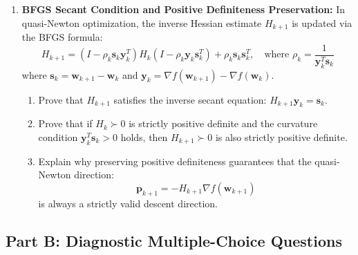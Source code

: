 \begin{enumerate}[label=\textbf{P\arabic*.}]
    \item \textbf{BFGS Secant Condition and Positive Definiteness Preservation:}
    In quasi-Newton optimization, the inverse Hessian estimate $H_{k+1}$ is updated via the BFGS formula:
    \begin{equation}
    H_{k+1} = \left( I - \rho_k \mathbf{s}_k \mathbf{y}_k^T \right) H_k \left( I - \rho_k \mathbf{y}_k \mathbf{s}_k^T \right) + \rho_k \mathbf{s}_k \mathbf{s}_k^T, \quad \text{where } \rho_k = \frac{1}{\mathbf{y}_k^T \mathbf{s}_k}
    \end{equation}
    where $\mathbf{s}_k = \mathbf{w}_{k+1} - \mathbf{w}_k$ and $\mathbf{y}_k = \nabla f(\mathbf{w}_{k+1}) - \nabla f(\mathbf{w}_k)$.
    \begin{enumerate}[label=(\alph*)]
        \item Prove that $H_{k+1}$ satisfies the inverse secant equation: $H_{k+1} \mathbf{y}_k = \mathbf{s}_k$.
        \item Prove that if $H_k \succ 0$ is strictly positive definite and the curvature condition $\mathbf{y}_k^T \mathbf{s}_k > 0$ holds, then $H_{k+1} \succ 0$ is also strictly positive definite.
        \item Explain why preserving positive definiteness guarantees that the quasi-Newton direction:
        \begin{equation*}
        \mathbf{p}_{k+1} = -H_{k+1} \nabla f(\mathbf{w}_{k+1})
        \end{equation*}
        is always a strictly valid descent direction.
    \end{enumerate}
\end{enumerate}

\subsection*{Part B: Diagnostic Multiple-Choice Questions}

